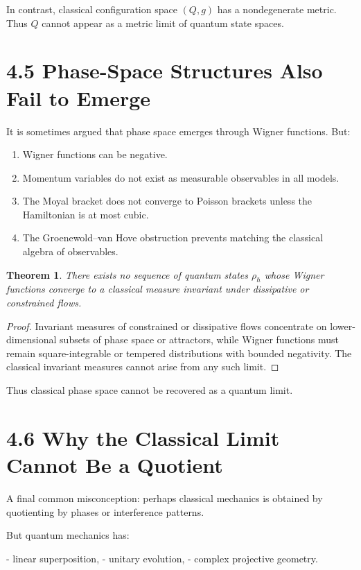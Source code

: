\documentclass[12pt,oneside]{book}
\theoremstyle{plain}
\newtheorem{theorem}{Theorem}[chapter]
\theoremstyle{definition}
\begin{document}
In contrast, classical configuration space $(Q,g)$ has a nondegenerate metric.  
Thus $Q$ cannot appear as a metric limit of quantum state spaces.

\section{4.5 Phase-Space Structures Also Fail to Emerge}

It is sometimes argued that phase space emerges through Wigner functions.  
But:

\begin{enumerate}
\item Wigner functions can be negative.
\item Momentum variables do not exist as measurable observables in all models.
\item The Moyal bracket does not converge to Poisson brackets unless the Hamiltonian is at most cubic.
\item The Groenewold–van Hove obstruction prevents matching the classical algebra of observables.
\end{enumerate}

\begin{theorem}
There exists no sequence of quantum states $\rho_\hbar$ whose Wigner functions converge to a classical measure invariant under dissipative or constrained flows.
\end{theorem}

\begin{proof}
Invariant measures of constrained or dissipative flows concentrate on lower-dimensional subsets of phase space or attractors, while Wigner functions must remain square-integrable or tempered distributions with bounded negativity.  The classical invariant measures cannot arise from any such limit.
\end{proof}

Thus classical phase space cannot be recovered as a quantum limit.

\section{4.6 Why the Classical Limit Cannot Be a Quotient}

A final common misconception:  
perhaps classical mechanics is obtained by quotienting by phases or interference patterns.

But quantum mechanics has:

- linear superposition,
- unitary evolution,
- complex projective geometry.
\end{document}
